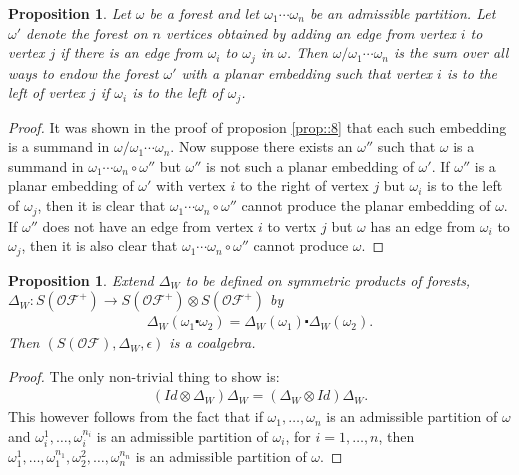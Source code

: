 \documentclass[10pt,a4paper]{article}
\newtheorem{proposition}[theorem]{Proposition}
\begin{document}
\begin{proposition}
Let $\omega$ be a forest and let $\omega_1 \cdots \omega_n$ be an admissible partition. Let $\omega'$ denote the forest on $n$ vertices obtained by adding an edge from vertex $i$ to vertex $j$ if there is an edge from $\omega_i$ to $\omega_j$ in $\omega$. Then $\omega/\omega_1\cdots\omega_n$ is the sum over all ways to endow the forest $\omega'$ with a planar embedding such that vertex $i$ is to the left of vertex $j$ if $\omega_i$ is to the left of $\omega_j$.
\end{proposition}

\begin{proof}
It was shown in the proof of proposion \ref{prop::8} that each such embedding is a summand in $\omega/\omega_1 \cdots \omega_n$. Now suppose there exists an $\omega''$ such that $\omega$ is a summand in $\omega_1 \cdots \omega_n \circ \omega''$ but $\omega''$ is not such a planar embedding of $\omega'$. If $\omega''$ is a planar embedding of $\omega'$ with vertex $i$ to the right of vertex $j$ but $\omega_i$ is to the left of $\omega_j$, then it is clear that $\omega_1 \cdots \omega_n \circ \omega''$ cannot produce the planar embedding of $\omega$. If $\omega''$ does not have an edge from vertex $i$ to vertx $j$ but $\omega$ has an edge from $\omega_i$ to $\omega_j$, then it is also clear that $\omega_1 \cdots \omega_n \circ \omega''$ cannot produce $\omega$.
\end{proof}


\begin{proposition}
Extend $\Delta_W$ to be defined on symmetric products of forests, $\Delta_{W}: S(\mathcal{OF^+}) \to S(\mathcal{OF^+}) \otimes S(\mathcal{OF^+})$ by
\begin{align*}
\Delta_W(\omega_1 \centerdot \omega_2)=\Delta_W(\omega_1) \centerdot \Delta_W(\omega_2).
\end{align*}
Then $(S(\mathcal{OF}),\Delta_W,\epsilon)$ is a coalgebra.
\end{proposition}
\begin{proof}
The only non-trivial thing to show is:
\begin{align*}
(Id \otimes \Delta_W)\Delta_W=(\Delta_W \otimes Id)\Delta_W.
\end{align*}
This however follows from the fact that if $\omega_1, \dots, \omega_n$ is an admissible partition of $\omega$ and $\omega_i^1,\dots, \omega_i^{n_i}$ is an admissible partition of $\omega_i$, for $i=1,\dots,n$, then $\omega_1^1,\dots,\omega_1^{n_1},\omega_2^2,\dots,\omega_n^{n_n}$ is an admissible partition of $\omega$.
\end{proof}
\end{document}
